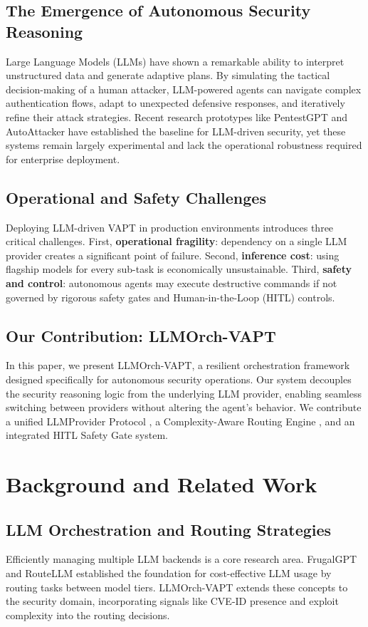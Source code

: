 \documentclass[conference,compsoc]{IEEEtran}
\begin{document}
\subsection{The Emergence of Autonomous Security Reasoning}
Large Language Models (LLMs) have shown a remarkable ability to interpret unstructured data and generate adaptive plans. By simulating the tactical decision-making of a human attacker, LLM-powered agents can navigate complex authentication flows, adapt to unexpected defensive responses, and iteratively refine their attack strategies. Recent research prototypes like PentestGPT \cite{pentestgpt} and AutoAttacker \cite{autoattacker} have established the baseline for LLM-driven security, yet these systems remain largely experimental and lack the operational robustness required for enterprise deployment.

\subsection{Operational and Safety Challenges}
Deploying LLM-driven VAPT in production environments introduces three critical challenges. First, \textbf{operational fragility}: dependency on a single LLM provider creates a significant point of failure. Second, \textbf{inference cost}: using flagship models for every sub-task is economically unsustainable. Third, \textbf{safety and control}: autonomous agents may execute destructive commands if not governed by rigorous safety gates and Human-in-the-Loop (HITL) controls.

\subsection{Our Contribution: LLMOrch-VAPT}
In this paper, we present LLMOrch-VAPT, a resilient orchestration framework designed specifically for autonomous security operations. Our system decouples the security reasoning logic from the underlying LLM provider, enabling seamless switching between providers without altering the agent's behavior. We contribute a unified LLMProvider Protocol \cite{litellm}, a Complexity-Aware Routing Engine \cite{routellm}, and an integrated HITL Safety Gate system.

\section{Background and Related Work}
\subsection{LLM Orchestration and Routing Strategies}
Efficiently managing multiple LLM backends is a core research area. FrugalGPT \cite{frugalgpt} and RouteLLM \cite{routellm} established the foundation for cost-effective LLM usage by routing tasks between model tiers. LLMOrch-VAPT extends these concepts to the security domain, incorporating signals like CVE-ID presence and exploit complexity into the routing decisions.
\end{document}
